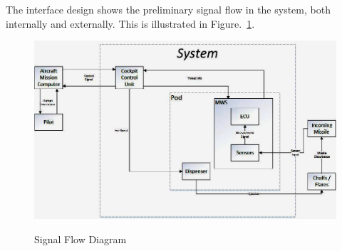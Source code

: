 The interface design shows the preliminary signal flow in the system, both internally and externally. This is illustrated in Figure.~\ref{fig:sigFlowDiagram}.

\begin{figure}[h]
	\centering
	\includegraphics[scale=0.5]{./images/SignalFlowDiagram}\\
	\caption{Signal Flow Diagram}
    \label{fig:sigFlowDiagram}
\end{figure}